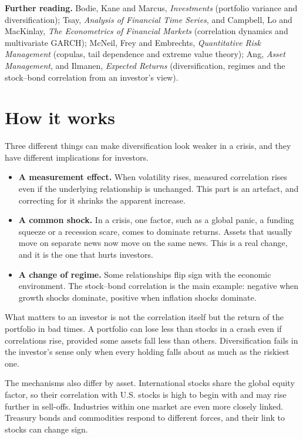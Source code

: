 \textbf{Further reading.} Bodie, Kane and Marcus, \emph{Investments} (portfolio variance and diversification); Tsay, \emph{Analysis of Financial Time Series}, and Campbell, Lo and MacKinlay, \emph{The Econometrics of Financial Markets} (correlation dynamics and multivariate GARCH); McNeil, Frey and Embrechts, \emph{Quantitative Risk Management} (copulas, tail dependence and extreme value theory); Ang, \emph{Asset Management}, and Ilmanen, \emph{Expected Returns} (diversification, regimes and the stock--bond correlation from an investor's view).

\section{How it works}
\label{sec:20-how}

Three different things can make diversification look weaker in a crisis, and they have different implications for investors.

\begin{itemize}
  \item \textbf{A measurement effect.} When volatility rises, measured correlation rises even if the underlying relationship is unchanged. This part is an artefact, and correcting for it shrinks the apparent increase.
  \item \textbf{A common shock.} In a crisis, one factor, such as a global panic, a funding squeeze or a recession scare, comes to dominate returns. Assets that usually move on separate news now move on the same news. This is a real change, and it is the one that hurts investors.
  \item \textbf{A change of regime.} Some relationships flip sign with the economic environment. The stock--bond correlation is the main example: negative when growth shocks dominate, positive when inflation shocks dominate.
\end{itemize}

What matters to an investor is not the correlation itself but the return of the portfolio in bad times. A portfolio can lose less than stocks in a crash even if correlations rise, provided some assets fall less than others. Diversification fails in the investor's sense only when every holding falls about as much as the riskiest one.

The mechanisms also differ by asset. International stocks share the global equity factor, so their correlation with U.S. stocks is high to begin with and may rise further in sell-offs. Industries within one market are even more closely linked. Treasury bonds and commodities respond to different forces, and their link to stocks can change sign.

